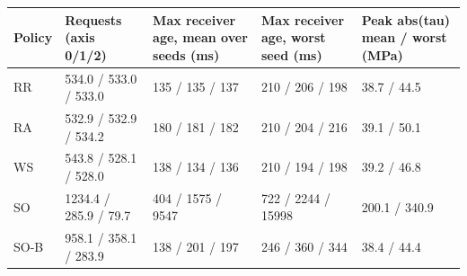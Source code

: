 \begin{tabular}{@{}lllll@{}}
\toprule
Policy & Requests (axis 0/1/2) & Max receiver age, mean over seeds (ms) & Max receiver age, worst seed (ms) & Peak abs(tau) mean / worst (MPa) \\
\midrule
RR & 534.0 / 533.0 / 533.0 & 135 / 135 / 137 & 210 / 206 / 198 & 38.7 / 44.5 \\
RA & 532.9 / 532.9 / 534.2 & 180 / 181 / 182 & 210 / 204 / 216 & 39.1 / 50.1 \\
WS & 543.8 / 528.1 / 528.0 & 138 / 134 / 136 & 210 / 194 / 198 & 39.2 / 46.8 \\
SO & 1234.4 / 285.9 / 79.7 & 404 / 1575 / 9547 & 722 / 2244 / 15998 & 200.1 / 340.9 \\
SO-B & 958.1 / 358.1 / 283.9 & 138 / 201 / 197 & 246 / 360 / 344 & 38.4 / 44.4 \\
\bottomrule
\end{tabular}
